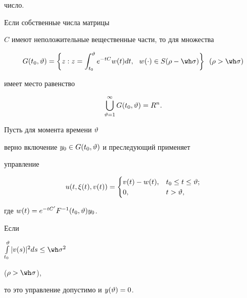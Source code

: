 число.





\begin{assrt}


Если собственные числа матрицы 


$C $ имеют неположительные вещественные части, то для множества


$$


G(t_0, \v) = \bigg\{z: z = \int_{t_0}^{\v}e^{-tC}w(t)dt, \ \


w(\cdot) \in S(\rho - \wh\s) \bigg\} \ \ (\rho > \wh\s)


$$


имеет место равенство


$$


\bigcup_{\v=1}^{\infty} G(t_0, \v) = R^n.


$$


\end{assrt}





\begin{assrt}


Пусть для момента времени $\vartheta $


верно включение $y_0 \in G(t_0, \vartheta) $ и преследующий применяет


управление


$$


u(t, \xi(t), v(t)) =


\begin{cases}


v(t) - w(t), & t_0 \q t \q \v; \\


0, & t > \v,


\end{cases}


$$


где $ w(t) = e^{-tC'}F^{-1}(t_0, \vartheta)y_0$.


\end{assrt}





Если


$\int\limits_{t_0}^{\v}|v(s)|^2ds \leq \wh\s^2$


($\rho >\wh\s$),


то это управление допустимо и $y(\vartheta) = 0$.





